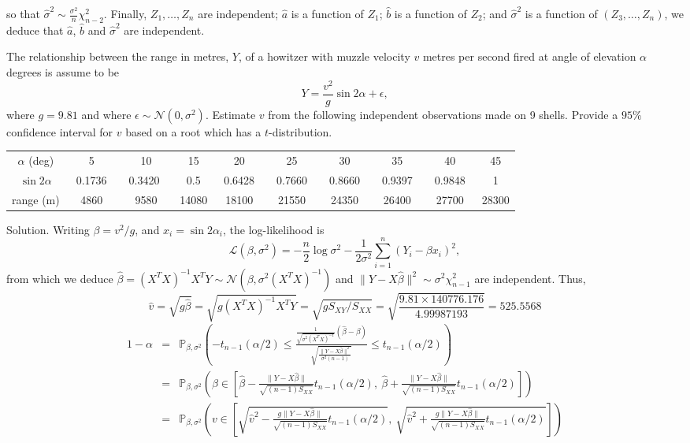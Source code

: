 so that $\hat{\sigma}^2\sim \frac{\sigma^2}{n}\chi_{n-2}^2$. Finally, $Z_1,\dots,Z_n$ are independent; $\hat{a}$ is a function of $Z_1$; $\hat{b}$ is a function of $Z_2$; and $\hat{\sigma}^2$ is a function of $(Z_3,\dots,Z_n)$, we deduce that $\hat{a}$, $\hat{b}$ and $\hat{\sigma}^2$ are independent.





\item The relationship between the range in metres, $Y$, of a howitzer with muzzle velocity $v$ metres per second fired at angle of elevation $\alpha$ degrees is assume to be
\begin{equation}
Y = \frac{v^2}{g}\sin2\alpha+\epsilon,
\end{equation}
where $g=9.81$ and where $\epsilon\sim\mathcal{N}(0,\sigma^2)$. Estimate $v$ from the following independent observations made on 9 shells. Provide a $95\%$ confidence interval for $v$ based on a root which has a $t$-distribution.
\begin{center}
\begin{tabular}{cccccccccc}
$\alpha$ (deg) & 5 & 10 & 15 & 20 & 25 & 30 & 35 & 40 & 45  \\
$\sin 2\alpha$ & \ 0.1736\ &\  0.3420 \ &\ 0.5\ &\ 0.6428\ &\ 0.7660\ &\ 0.8660\ &\ 0.9397\ &\ 0.9848\ &\ 1\ \\
range (m) & 4860 & 9580 & 14080 & 18100 & 21550 & 24350 & 26400 & 27700 & 28300
\end{tabular}
\end{center}



Solution. Writing $\beta=v^2/g$, and $x_i=\sin2\alpha_i$, the log-likelihood is
\begin{equation}
\mathcal{L}(\beta,\sigma^2) = -\frac{n}{2}\log\sigma^2 - \frac{1}{2\sigma^2}\sum^n_{i=1}(Y_i-\beta x_i)^2,
\end{equation}
from which we deduce $\hat{\beta}=(X^TX)^{-1}X^TY\sim \mathcal{N}(\beta,\sigma^2(X^TX)^{-1})$ and $\|Y-X\hat{\beta}\|^2\sim \sigma^2\chi_{n-1}^2$ are independent. Thus,
\begin{equation}
\hat{v} = \sqrt{g\hat{\beta}} = \sqrt{g(X^TX)^{-1}X^TY} = \sqrt{gS_{XY}/S_{XX}} = \sqrt{\frac{9.81\times140776.176}{4.99987193}} = 525.5568
\end{equation}
\begin{eqnarray}
1-\alpha & = & \mathbb{P}_{\beta,\sigma^2}\left(-t_{n-1}(\alpha/2) \leq \frac{\frac{1}{\sqrt{\sigma^2(X^TX)^{-1}}}\left(\hat{\beta}-\beta\right)}{\sqrt{\frac{\|Y-X\hat{\beta}\|^2}{\sigma^2(n-1)}}}\leq t_{n-1}(\alpha/2) \right)\nonumber\\
& = & \mathbb{P}_{\beta,\sigma^2}\left(\beta\in \left[\hat{\beta} - \frac{\|Y-X\hat{\beta}\|}{\sqrt{(n-1)S_{XX}}}t_{n-1}(\alpha/2),\ \hat{\beta} + \frac{\|Y-X\hat{\beta}\|}{\sqrt{(n-1)S_{XX}}}t_{n-1}(\alpha/2) \right]\right)\nonumber\\
& = & \mathbb{P}_{\beta,\sigma^2}\left(v \in \left[\sqrt{\hat{v}^2 - \frac{g\|Y-X\hat{\beta}\|}{\sqrt{(n-1)S_{XX}}}t_{n-1}(\alpha/2)},\ \sqrt{\hat{v}^2 + \frac{g\|Y-X\hat{\beta}\|}{\sqrt{(n-1)S_{XX}}}t_{n-1}(\alpha/2)} \right]\right)
\end{eqnarray}

